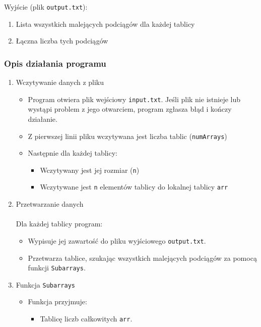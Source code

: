 \documentclass[a4paper,12pt]{article}
\begin{document}
\begin{flushleft}
Wyjście (plik \texttt{output.txt}):
\begin{enumerate}
	\item{Lista wszystkich malejących podciągów dla każdej tablicy}
	\item{Łączna liczba tych podciągów}
\end{enumerate}
\end{flushleft}

\newpage

\subsubsection{Opis działania programu}

\begin{enumerate}
\item{Wczytywanie danych z pliku}
\begin{itemize}
\item{Program otwiera plik wejściowy \texttt{input.txt}. Jeśli plik nie istnieje lub wystąpi problem z jego otwarciem, program zgłasza błąd i kończy działanie.}
\item{Z pierwszej linii pliku wczytywana jest liczba tablic (\texttt{numArrays})}
\item{Następnie dla każdej tablicy:}
\begin{itemize}
\item[\textbullet]{Wczytywany jest jej rozmiar (\texttt{n})}
\item[\textbullet]{Wczytywane jest \texttt{n} elementów tablicy do lokalnej tablicy \texttt{arr}}
\end{itemize}
\end{itemize}
\item{Przetwarzanie danych}\\ \\
Dla każdej tablicy program:
\begin{itemize}
\item{Wypisuje jej zawartość do pliku wyjściowego \texttt{output.txt}.}
\item{Przetwarza tablice, szukając wszystkich malejących podciągów za pomocą funkcji \texttt{Subarrays}.}
\end{itemize}
\item{Funkcja \texttt{Subarrays}}
\begin{itemize}
\item{Funkcja przyjmuje:}
\begin{itemize}
\item[\textbullet]{Tablicę liczb całkowitych \texttt{arr}.}

\end{itemize}
\end{itemize}
\end{enumerate}
\end{document}

